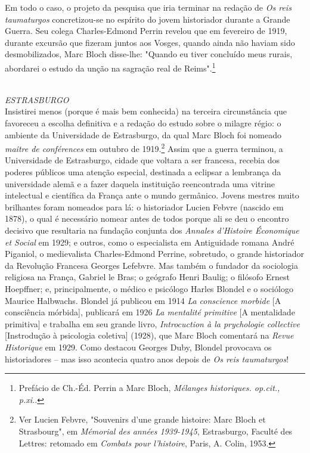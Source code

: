 \documentclass[a5paper]{book}
\begin{document}
Em todo o caso, o projeto da pesquisa que iria terminar na redação de \textit{Os reis taumaturgos} concretizou-se no espírito do jovem historiador durante a Grande Guerra. Seu colega Charles-Edmond Perrin revelou que em fevereiro de 1919, durante excursão que fizeram juntos aos Vosges, quando ainda não haviam sido desmobilizados, Marc Bloch disse-lhe: "Quando eu tiver concluído meus rurais, abordarei o estudo da unção na sagração real de Reims".\footnote{Prefácio de Ch.-Éd. Perrin a Marc Bloch, \textit{Mélanges historiques. op.cit., p.xi.}.}

~\\ \large \textit{ESTRASBURGO} ~\\

Insistirei menos (porque é mais bem conhecida) na terceira circunstância que favoreceu a escolha definitiva e a redação do estudo sobre o milagre régio: o ambiente da Universidade de Estrasburgo, da qual Marc Bloch foi nomeado \textit{maître de conférences} em outubro de 1919.\footnote{Ver Lucien Febvre, "Souvenirs d'une grande histoire: Marc Bloch et Strasbourg", em \textit{Mémorial des années 1939-1945}, Estrasburgo, Faculté des Lettres: retomado em \textit{Combats pour l'histoire}, Paris, A. Colin, 1953.} Assim que a guerra terminou, a Universidade de Estrasburgo, cidade que voltara a ser francesa, recebia dos poderes públicos uma atenção especial, destinada a eclipsar a lembrança da universidade alemã e a fazer daquela instituição reencontrada uma vitrine intelectual e científica da França ante o mundo germânico. Jovens mestres muito brilhantes foram nomeados para lá: o historiador Lucien Febvre (nascido em 1878), o qual é necessário nomear antes de todos porque ali se deu o encontro decisivo que resultaria na fundação conjunta dos \textit{Annales d'Histoire Économique et Social} em 1929; e outros, como o especialista em Antiguidade romana André Piganiol, o medievalista Charles-Edmond Perrine, sobretudo, o grande historiador da Revolução Francesa Georges Lefebvre. Mas também o fundador da sociologia religiosa na França, Gabriel le Bras; o geógrafo Henri Baulig; o filósofo Ernest Hoepf{\kern0pt}fner; e, principalmente, o médico e psicólogo Harles Blondel e o sociólogo Maurice Halbwachs. Blondel já publicou em 1914 \textit{La conscience morbide} [A consciência mórbida], publicará em 1926 \textit{La mentalité primitive} [A mentalidade primitiva] e trabalha em seu grande livro, \textit{Introcuction à la prychologie collective} [Instrodução à psicologia coletiva] (1928), que Marc Bloch comentará na \textit{Revue Historique} em 1929. Como destacou Georges Duby, Blondel provocava os historiadores -- mas isso acontecia quatro anos depois de \textit{Os reis taumaturgos}!
\end{document}
